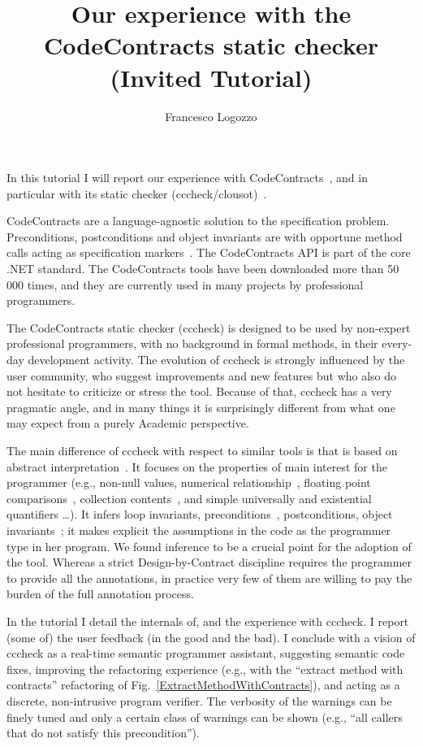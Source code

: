 \documentclass{llncs}
\title{Our experience with the\\ CodeContracts static checker \\ 
(Invited Tutorial)}
\author{Francesco Logozzo}
\institute{Microsoft Research, Redmond, WA (USA) \\
\email{logozzo@microsoft.com}
}
\begin{document}
\maketitle
In this tutorial I will report our experience with CodeContracts~\cite{codecontracts}, and in particular with its static checker (cccheck/clousot)~\cite{cccheck}.

CodeContracts are a language-agnostic solution to the specification problem. 
Preconditions, postconditions and object invariants are with opportune method calls acting as specification markers~\cite{embedded-cc-sac-oops-2010}. 
The CodeContracts API is part of the core .NET standard. 
The CodeContracts tools have been downloaded more than 50 000 times, and they are currently used in many projects by professional programmers.

The CodeContracts static checker (cccheck) is designed to be used by non-expert professional programmers, with no background in formal methods, in their every-day development activity. 
The evolution of cccheck is strongly influenced by the user community, who suggest improvements and new features but who also do not hesitate to criticize or stress the tool. 
Because of that, cccheck has a very pragmatic angle, and in many things it is surprisingly different from what one may expect from a purely Academic perspective. 

The main difference of cccheck with respect to similar tools is that is based on abstract interpretation~\cite{CousotCousot77}. 
It focuses on the properties of main interest for the programmer (e.g., non-null values, numerical relationship~\cite{LogozzoFahndrich08,subpolyhedra}, floating point comparisons~\cite{LogozzoFahndrich11}, collection contents~\cite{CousotCousotLogozzo-POPL11}, and simple universally and existential quantifiers \dots). 
It infers loop invariants, preconditions~\cite{CousotCousotLogozzo-VMCAI11}, postconditions, object invariants~\cite{Logozzo-VMCAI07}; it makes explicit the assumptions in the code as the programmer type in her program. 
We found inference to be a crucial point for the adoption of the tool. 
Whereas a strict Design-by-Contract discipline requires the programmer to provide all the annotations, in practice very few of them are willing to pay the burden of the full annotation process. 

In the tutorial I detail the internals of, and the experience with cccheck. 
I report (some of) the user feedback (in the good and the bad). 
I  conclude with a vision of cccheck as a real-time semantic programmer assistant, suggesting semantic code fixes, improving the refactoring  experience (e.g., with the ``extract method with contracts'' refactoring of Fig.~\ref{ExtractMethodWithContracts}), and acting as a discrete, non-intrusive program verifier. 
The verbosity of the warnings can be finely tuned and only a certain class of warnings can be shown (e.g., ``all callers that do not satisfy this precondition'').
\end{document}
